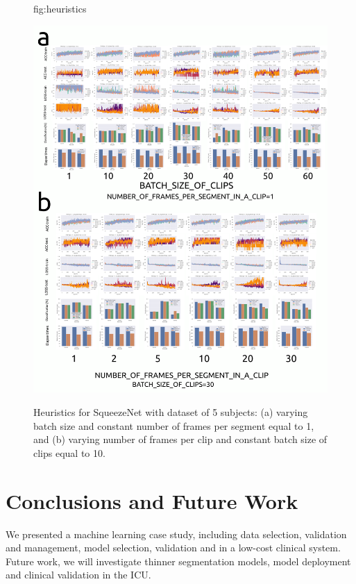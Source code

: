 \documentclass[mlabstract,twocolumn]{jmlr}
\begin{document}
\begin{figure}[htbp]
\floatconts
  {fig:heuristics}
  {
      \caption{
          Heuristics for SqueezeNet \citep{iandola2017squeezenet} with dataset of 5 subjects:
          (a) varying batch size and constant number of frames per segment equal to 1, and
          (b) varying number of frames per clip and constant batch size of clips equal to 10.
      }
  }
  {\includegraphics[width=\columnwidth]{../figures/heuristics_results/versions/drawing-v00}}%
\end{figure}

\section{Conclusions and Future Work}
We presented a machine learning case study, including data selection, validation and management, model selection, validation and in a low-cost clinical system.
Future work, we will investigate thinner segmentation models, model deployment and clinical validation in the ICU.
\end{document}
